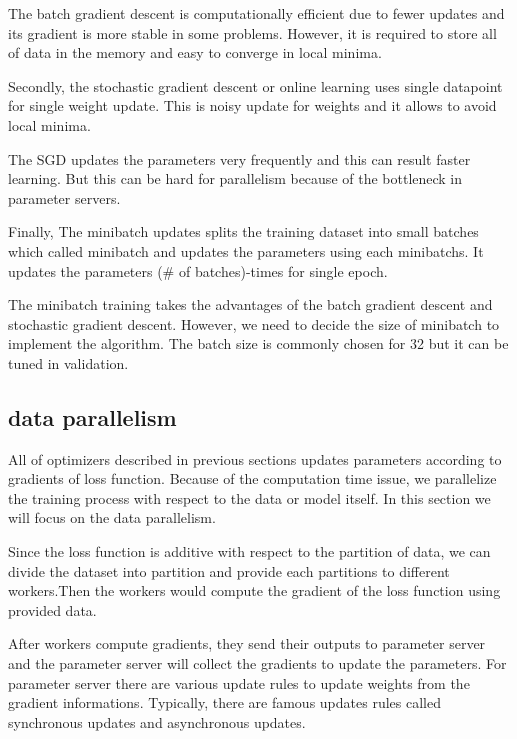 \documentclass[11pt]{article}
\begin{document}
	The batch gradient descent is computationally efficient due to fewer updates and its gradient is more stable in some problems. However, it is required to store all of data in the memory and easy to converge in local minima.

	Secondly, the stochastic gradient descent or online learning uses single datapoint for single weight update. This is noisy update for weights and it allows to avoid local minima. 

	The SGD updates the parameters very frequently and this can result faster learning. But this can be hard for parallelism because of the bottleneck in parameter servers.

	Finally, The minibatch updates splits the training dataset into small batches which called minibatch and updates the parameters using each minibatchs. It updates the parameters (\# of batches)-times for single epoch.
	
	The minibatch training takes the advantages of the batch gradient descent and stochastic gradient descent. However, we need to decide the size of minibatch to implement the algorithm. The batch size is commonly chosen for 32 but it can be tuned in validation.

	\subsection{data parallelism}
	All of optimizers described in previous sections updates parameters according to gradients of loss function. Because of the computation time issue, we parallelize the training process with respect to the data or model itself. In this section we will focus on the data parallelism.

	Since the loss function is additive with respect to the partition of data, we can divide the dataset into partition and provide each partitions to different workers.Then the workers would compute the gradient of the loss function using provided data.

	After workers compute gradients, they send their outputs to parameter server and the parameter server will collect the gradients to update the parameters. For parameter server there are various update rules to update weights from the gradient informations. Typically, there are famous updates rules called synchronous updates and asynchronous updates.
\end{document}
